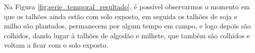 Na Figura \ref{fig:serie_temporal_resultado}, é possível observarmos o momento em que os talhões ainda estão com solo exposto, em seguida os talhões de soja e milho são plantados, permanecem por algum tempo em campo, e logo depois são colhidos, dando lugar à talhões de algodão e milhete, que também são colhidos e voltam a ficar com o solo exposto. 


\renewcommand{\cleardoublepage}{}
\renewcommand{\clearpage}{}
\vspace{5mm}